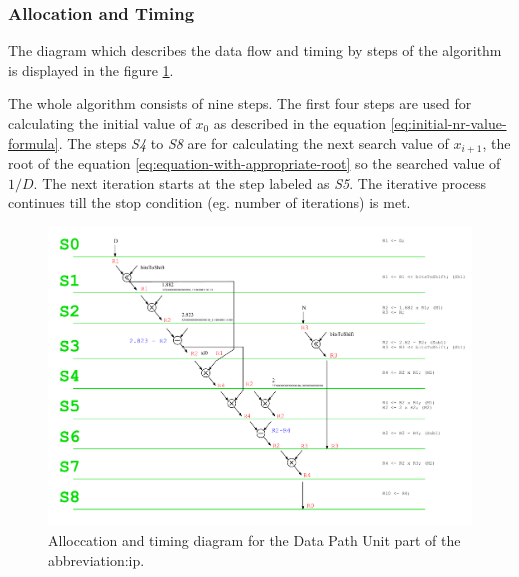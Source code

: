 \documentclass[a4paper, twoside, 11pt]{article}
\newcommand{\fbar}{\FloatBarrier}
\begin{document}
\subsubsection{Allocation and Timing}\label{subsubsec:division-allocation-and-timing}
The diagram which describes the data flow and timing by steps of the algorithm is displayed in the figure \ref{fig:division-allocation-timing}.\par
The whole algorithm consists of nine steps. The first four steps are used for calculating the initial value of $x_0$ as described in the equation \ref{eq:initial-nr-value-formula}. The steps \textit{S4} to \textit{S8} are for calculating the next search value of $x_{i+1}$, the root of the equation \ref{eq:equation-with-appropriate-root} so the searched value of $1/D$. The next iteration starts at the step labeled as \textit{S5}. The iterative process continues till the stop condition (eg. number of iterations) is met.
\begin{figure}
  \centering
  \includegraphics[width=1\textwidth]{src/pdf/allocation-timing.pdf}
   \caption{Alloccation and timing diagram for the Data Path Unit part of the \gls{abbreviation:ip}.}
  \label{fig:division-allocation-timing}
\end{figure}

\fbar
\end{document}
